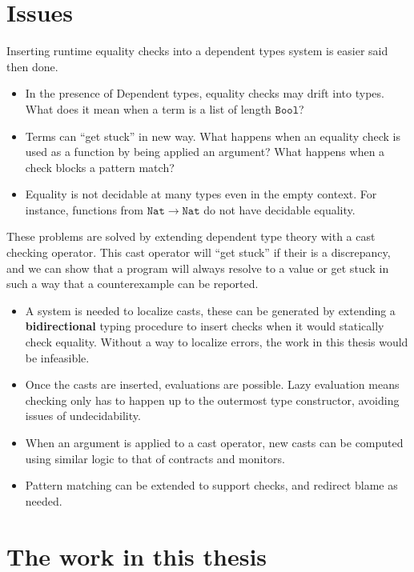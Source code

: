 \section{Issues}

Inserting runtime equality checks into a dependent types system is easier said then done.
\begin{itemize}
\item In the presence of Dependent types, equality checks may drift into types.
What does it mean when a term is a list of length $\mathtt{Bool}$?
\item Terms can ``get stuck'' in new way.
What happens when an equality check is used as a function by being applied an argument?
What happens when a check blocks a pattern match?
\item Equality is not decidable at many types even in the empty context.
For instance, functions from $\mathtt{Nat}\rightarrow\mathtt{Nat}$ do not have decidable equality.
\end{itemize}
These problems are solved by extending dependent type theory with a cast checking operator.
This cast operator will ``get stuck'' if their is a discrepancy, and we can show that a program will always resolve to a value or get stuck in such a way that a counterexample can be reported.
\begin{itemize}
\item A system is needed to localize casts, these can be generated by extending a \textbf{bidirectional} typing procedure to insert checks when it would statically check equality.
Without a way to localize errors, the work in this thesis would be infeasible.
\item Once the casts are inserted, evaluations are possible.
Lazy evaluation means checking only has to happen up to the outermost type constructor, avoiding issues of undecidability.
\item When an argument is applied to a cast operator, new casts can be computed using similar logic to that of contracts and monitors\cite{10.1145/581478.581484}.
\item Pattern matching can be extended to support checks, and redirect blame as needed. 
\end{itemize}

\section{The work in this thesis}

